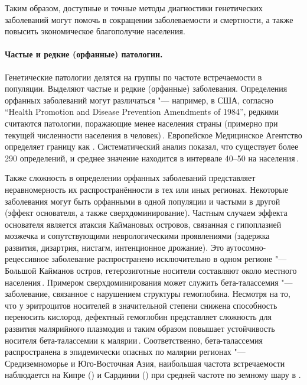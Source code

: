 \documentclass[a4paper,14pt]{extarticle}
\newcommand{\thousands}{тыс.}
\newcommand{\mln}{млн}
\newcommand{\ecitep}[1]{\textenglish{\citep{#1}}}
\begin{document}
Таким образом, доступные и точные методы диагностики генетических заболеваний могут помочь в сокращении заболеваемости и смертности, а также повысить экономическое благополучие населения.

\paragraph{Частые и редкие (орфанные) патологии.}
Генетические патологии делятся на группы по частоте встречаемости в популяции.
Выделяют частые и редкие (орфанные) заболевания.
Определения орфанных заболеваний могут различаться "--- например, в США, согласно \textenglish{``Health Promotion and Disease Prevention Amendments of 1984''}, редкими считаются патологии, поражающие менее \numprint[\thousands]{200} населения страны (примерно  при текущей численности населения в \numprint[\mln]{326} человек)\,\ecitep{Herder_2017}.
Европейское Медицинское Агентство определяет границу как .
Систематический анализ показал, что существует более 290 определений, и среднее значение находится в интервале 40--50 на \numprint[\thousands]{100} населения\,\ecitep{Richter_2015}.

Также сложность в определении орфанных заболеваний представляет неравномерность их распространённости в тех или иных регионах.
Некоторые заболевания могут быть орфанными в одной популяции и частыми в другой (эффект основателя, а также сверхдоминирование).
Частным случаем эффекта основателя является атаксия Каймановых островов, связанная с гипоплазией мозжечка и сопутствующими неврологическими проявлениями (задержка развития, дизартрия, нистагм, интенционное дрожание).
Это аутосомно-рецессивное заболевание распространено исключительно в одном регионе "--- Большой Кайманов остров, гетерозиготные носители составляют около  местного населения\,\ecitep{Bomar_2003}.
Примером сверхдоминирования может служить бета-талассемия "--- заболевание, связанное с нарушением структуры гемоглобина.
Несмотря на то, что у эритроцитов носителей в значительной степени снижена способность переносить кислород, дефектный гемоглобин представляет сложность для развития малярийного плазмодия и таким образом повышает устойчивость носителя бета-талассемии к малярии\,\ecitep{Galanello_2010}.
Соответственно, бета-талассемия распространена в эпидемически опасных по малярии регионах "--- Средиземноморье и Юго-Восточная Азия, наибольшая частота встречаемости наблюдается на Кипре () и Сардинии () при средней частоте по земному шару в .
\end{document}
